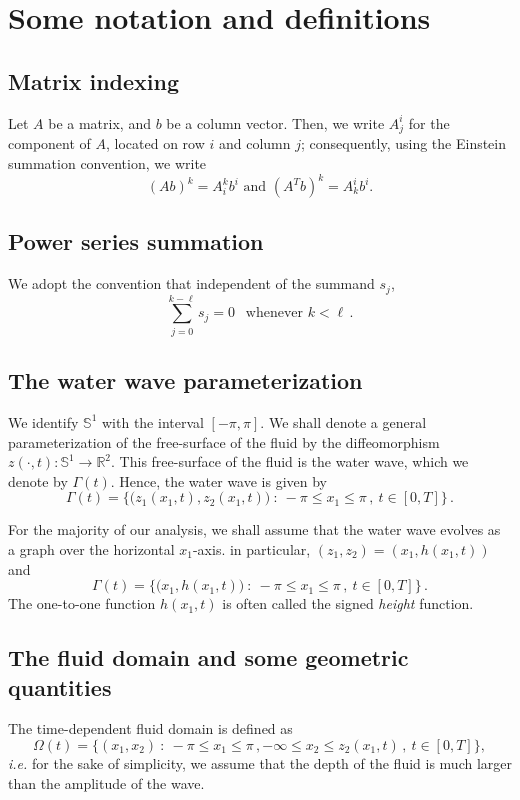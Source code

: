 \documentclass[11pt]{article}
\theoremstyle{plain}
\theoremstyle{definition}
\theoremstyle{definition}
\begin{document}
\section{Some notation and definitions}\label{sec:notation}

\subsection{Matrix indexing} Let $A$ be a matrix, and $b$ be a column vector. Then, we write $A^i_j$ for the component of $A$, located on row $i$ and column $j$;  consequently, using the Einstein summation convention, we write
$$
(Ab)^k=A^k_ib^i\text{ and }(A^Tb)^k=A^i_k b^i.
$$

\subsection{Power series summation}
We adopt the convention that independent of the summand $s_j$,
\begin{equation}\label{summation}
\sum_{j=0}^{k-\ell} s_j=0 \ \ \text{ whenever } k<\ell \,.
\end{equation}

\subsection{The water wave   parameterization}
We identify $ \mathbb{S}  ^1$ with the interval $[-\pi, \pi]$.   We shall denote a general parameterization of the free-surface
of the fluid by the diffeomorphism
$z( \cdot , t) : \mathbb{S}^1 \to \mathbb{R}^2  $.  This free-surface of the fluid is the water wave, which we denote by $\Gamma(t)$.  Hence, the water wave is given by
$$\Gamma(t)= \big\{\big(z_1(x_1,t), z_2(x_1,t)\big) \ : \ -\pi \le x_1 \le \pi\,,  \ t\in[0,T] \big\}  \,.$$

For the majority of our analysis, we shall assume that the water wave evolves as a graph over the horizontal $x_1$-axis.   in particular,  $(z_1,z_2)=(x_1, h(x_1,t))$ and
\begin{equation}\label{Gamma}
\Gamma(t)= \big\{\big(x_1, h(x_1,t)\big) \ : \ -\pi \le x_1 \le \pi\,,  \ t\in[0,T] \big\}  \,.
\end{equation}
The one-to-one function $h(x_1,t)$ is often called the signed {\it height} function.

\subsection{The fluid domain and some geometric quantities}
The time-dependent fluid domain is defined as
\begin{equation}\label{Omega}
\Omega(t) = \big\{ (x_1, x_2) \ : \ -\pi \le x_1 \le \pi\,, -\infty \le x_2 \le z_2(x_1,t)\,, \ t\in[0,T] \big\},
\end{equation}
\emph{i.e.} for the sake of simplicity, we assume that the depth of the fluid is much larger than the amplitude of the wave.
\end{document}
